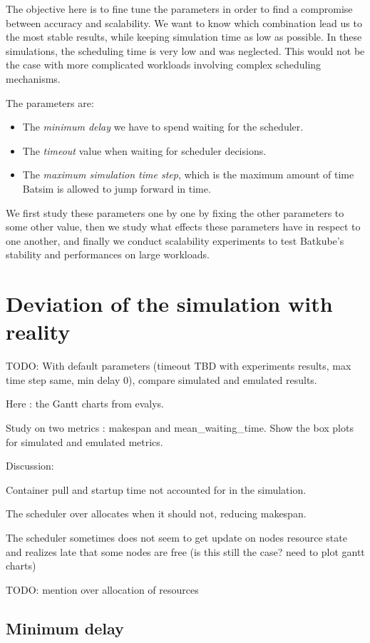 The objective here is to fine tune the parameters in order to find a compromise
between accuracy and scalability. We want to know which combination lead us to
the most stable results, while keeping simulation time as low as possible. In
these simulations, the scheduling time is very low and was neglected.  This
would not be the case with more complicated workloads involving complex
scheduling mechanisms.

The parameters are:
\begin{itemize}
	\item The \textit{minimum delay} we have to spend waiting for the
		scheduler.
	\item The \textit{timeout} value when waiting for scheduler decisions.
	\item The \textit{maximum simulation time step}, which is the maximum
		amount of time Batsim is allowed to jump forward in time.
\end{itemize}

We first study these parameters one by one by fixing the other parameters to
some other value, then we study what effects these parameters have in respect
to one another, and finally we conduct scalability experiments to test
Batkube's stability and performances on large workloads.

\section{Deviation of the simulation with reality}

TODO: With default parameters (timeout TBD with experiments results, max time step same, min delay 0), compare simulated and emulated results. 

Here : the Gantt charts from evalys.

Study on two metrics : makespan and mean\_waiting\_time. Show the box plots for
simulated and emulated metrics.

Discussion:

Container pull and startup time not accounted for in the simulation.

The scheduler over allocates when it should not, reducing makespan.

The scheduler sometimes does not seem to get update on nodes resource state and
realizes late that some nodes are free (is this still the case? need to plot
gantt charts)

TODO: mention over allocation of resources

\subsection{Minimum delay}

